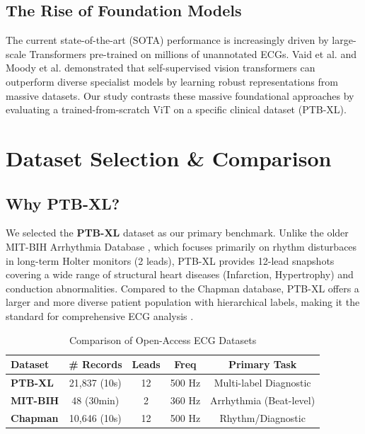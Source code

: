 \documentclass[conference]{IEEEtran}
\begin{document}
\subsection{The Rise of Foundation Models}
The current state-of-the-art (SOTA) performance is increasingly driven by large-scale Transformers pre-trained on millions of unannotated ECGs. Vaid et al. \cite{vaid2023foundational} and Moody et al. \cite{moody2025foundation} demonstrated that self-supervised vision transformers can outperform diverse specialist models by learning robust representations from massive datasets. Our study contrasts these massive foundational approaches by evaluating a trained-from-scratch ViT on a specific clinical dataset (PTB-XL).

\section{Dataset Selection \& Comparison}

\subsection{Why PTB-XL?}
We selected the \textbf{PTB-XL} dataset \cite{wagner2020ptbxl} as our primary benchmark. Unlike the older MIT-BIH Arrhythmia Database \cite{moody2001impact}, which focuses primarily on rhythm disturbaces in long-term Holter monitors (2 leads), PTB-XL provides 12-lead snapshots covering a wide range of structural heart diseases (Infarction, Hypertrophy) and conduction abnormalities. Compared to the Chapman database, PTB-XL offers a larger and more diverse patient population with hierarchical labels, making it the standard for comprehensive ECG analysis \cite{strodthoff2021deep}.

\begin{table}[htbp]
\caption{Comparison of Open-Access ECG Datasets}
\begin{center}
\begin{tabular}{lcccc}
\toprule
\textbf{Dataset} & \textbf{# Records} & \textbf{Leads} & \textbf{Freq} & \textbf{Primary Task} \\
\midrule
\textbf{PTB-XL} \cite{wagner2020ptbxl} & 21,837 (10s) & 12 & 500 Hz & Multi-label Diagnostic \\
\textbf{MIT-BIH} \cite{moody2001impact} & 48 (30min) & 2 & 360 Hz & Arrhythmia (Beat-level) \\
\textbf{Chapman} & 10,646 (10s) & 12 & 500 Hz & Rhythm/Diagnostic \\
\bottomrule
\end{tabular}
\label{tab:datasets}
\end{center}
\end{table}
\end{document}
